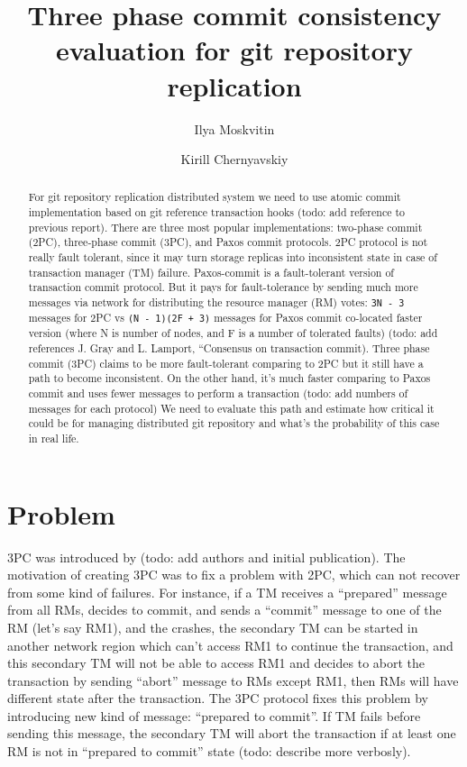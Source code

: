 \documentclass[acmlarge, screen, nonacm]{acmart}
\title{Three phase commit consistency evaluation for git repository replication}
\author{Ilya Moskvitin}
\author{Kirill Chernyavskiy}
\begin{document}
\begin{abstract}
  For git repository replication distributed system we need to use atomic
  commit implementation based on git reference transaction hooks (todo: add reference to previous report).
  There are three most popular implementations: two-phase commit (2PC), three-phase commit (3PC),
  and Paxos commit protocols. 2PC protocol is not really fault tolerant, since it may turn storage
  replicas into inconsistent state in case of transaction manager (TM) failure. Paxos-commit is a fault-tolerant
  version of transaction commit protocol. But it pays for fault-tolerance by sending much more messages via network
  for distributing the resource manager (RM) votes: \texttt{3N - 3} messages for 2PC vs
  \texttt{(N - 1)(2F + 3)} messages for Paxos commit co-located faster version (where N is number of nodes,
  and F is a number of tolerated faults)
  (todo: add references  J. Gray and L. Lamport, “Consensus on transaction commit).
  Three phase commit (3PC) claims to be more fault-tolerant comparing to 2PC but it still have a path to become
  inconsistent. On the other hand, it's much faster comparing to Paxos commit and uses fewer messages to perform a
  transaction (todo: add numbers of messages for each protocol) We need to evaluate this path and estimate how critical
  it could be for managing distributed git repository and what's the probability of this case in real life.
\end{abstract}

\maketitle

\section{Problem}

3PC was introduced by (todo: add authors and initial publication). The motivation of creating 3PC was to fix
a problem with 2PC, which can not recover from some kind of failures. For instance, if a TM receives a ``prepared''
message from all RMs, decides to commit, and sends a ``commit'' message to one of the RM (let's say RM1),
and the crashes, the secondary TM can be started in another network region which can't access RM1 to continue the transaction,
and this secondary TM will not be able to access RM1 and decides to abort the transaction by sending ``abort'' message
to RMs except RM1, then RMs will have different state after the transaction.
The 3PC protocol fixes this problem by introducing new kind of message: ``prepared to commit''. If TM fails before sending
this message, the secondary TM will abort the transaction if at least one RM is not in ``prepared to commit'' state
(todo: describe more verbosly).
\end{document}
